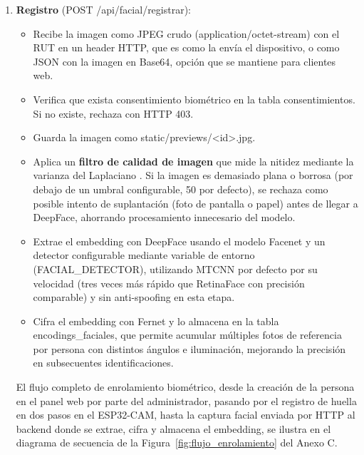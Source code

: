 \begin{enumerate}
    \item \textbf{Registro} (POST /api/facial/registrar):
    \begin{itemize}
        \item Recibe la imagen como JPEG crudo (application/octet-stream) con el RUT en un header HTTP, que es como la envía el dispositivo, o como JSON con la imagen en Base64, opción que se mantiene para clientes web.
        \item Verifica que exista consentimiento biométrico en la tabla consentimientos. Si no existe, rechaza con HTTP 403.
        \item Guarda la imagen como static/previews/<id>.jpg.
        \item Aplica un \textbf{filtro de calidad de imagen} que mide la nitidez mediante la varianza del Laplaciano \cite{pech2000_laplacian}. Si la imagen es demasiado plana o borrosa (por debajo de un umbral configurable, 50 por defecto), se rechaza como posible intento de suplantación (foto de pantalla o papel) antes de llegar a DeepFace, ahorrando procesamiento innecesario del modelo.
        \item Extrae el embedding con DeepFace usando el modelo Facenet y un detector configurable mediante variable de entorno (FACIAL\_DETECTOR), utilizando MTCNN por defecto por su velocidad (tres veces más rápido que RetinaFace con precisión comparable) y sin anti-spoofing en esta etapa.
        \item Cifra el embedding con Fernet y lo almacena en la tabla encodings\_faciales, que permite acumular múltiples fotos de referencia por persona con distintos ángulos e iluminación, mejorando la precisión en subsecuentes identificaciones.
    \end{itemize}

    El flujo completo de enrolamiento biométrico, desde la creación de la persona en el panel web por parte del administrador, pasando por el registro de huella en dos pasos en el ESP32-CAM, hasta la captura facial enviada por HTTP al backend donde se extrae, cifra y almacena el embedding, se ilustra en el diagrama de secuencia de la Figura~\ref{fig:flujo_enrolamiento} del Anexo C.


\end{enumerate}
